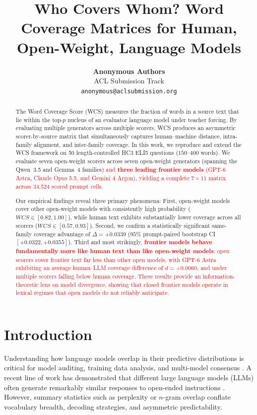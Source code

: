 \documentclass[11pt,a4paper,twocolumn]{article}
\title{\textbf{Who Covers Whom? Word Coverage Matrices for Human, Open-Weight, \diff{and Frontier} Language Models}}
\author{
  \textbf{Anonymous Authors} \\
  ACL Submission Track \\
  \texttt{anonymous@aclsubmission.org}
}
\date{}
\newcommand{\diff}[1]{\textcolor{red}{#1}}
\begin{document}
\maketitle

\begin{abstract}
The Word Coverage Score (WCS) measures the fraction of words in a source text that lie within the top-$p$ nucleus of an evaluator language model under teacher forcing. By evaluating multiple generators across multiple scorers, WCS produces an asymmetric scorer-by-source matrix that simultaneously captures human--machine distance, intra-family alignment, and inter-family coverage. In this work, we reproduce and extend the WCS framework on 50 length-controlled HC3 ELI5 questions ($150$--$400$ words). We evaluate seven open-weight scorers across seven open-weight generators (spanning the Qwen~3.5 and Gemma~4 families) \diff{and \textbf{three leading frontier models} (GPT-6 Astra, Claude Opus 5.5, and Gemini 4 Argon), yielding a complete $7 \times 11$ matrix across 34,524 scored prompt cells.}

Our empirical findings reveal three primary phenomena: First, open-weight models cover other open-weight models with consistently high probability ($WCS \in [0.82, 1.00]$), while human text exhibits substantially lower coverage across all scorers ($WCS \in [0.57, 0.93]$). Second, we confirm a statistically significant same-family coverage advantage of $\Delta = +0.0339$ ($95\%$ prompt-paired bootstrap CI $[+0.0322, +0.0355]$). Third and most strikingly, \diff{\textbf{frontier models behave fundamentally more like human text than like open-weight models}: open scorers cover frontier text far less than other open models, with GPT-6 Astra exhibiting an average human--LLM coverage difference of $d = +0.0060$, and under multiple scorers falling below human coverage. These results provide an information-theoretic lens on model divergence, showing that closed frontier models operate in lexical regimes that open models do not reliably anticipate.}
\end{abstract}

\section{Introduction}

Understanding how language models overlap in their predictive distributions is critical for model auditing, training data analysis, and multi-model consensus \cite{gehrmann2019gltr,jiang2025artificial}. A recent line of work has demonstrated that different large language models (LLMs) often generate remarkably similar responses to open-ended instructions \cite{jiang2025artificial}. However, summary statistics such as perplexity or $n$-gram overlap conflate vocabulary breadth, decoding strategies, and asymmetric predictability.
\end{document}
